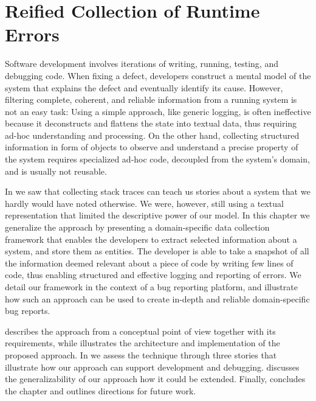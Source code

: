 

\chapter{Reified Collection of Runtime Errors}\label{ch:reified}


Software development involves iterations of writing, running, testing, and debugging code.
When fixing a defect, developers construct a mental model of the system that explains the defect and eventually identify its cause.
However, filtering complete, coherent, and reliable information from a running system is not an easy task: Using a simple approach, like generic logging, is often ineffective because it deconstructs and flattens the state into textual data, thus requiring ad-hoc understanding and processing.
On the other hand, collecting structured information in form of objects to observe and understand a precise property of the system requires specialized ad-hoc code, decoupled from the system's domain, and is usually not reusable.

In  we saw that  collecting stack traces can teach us stories about a system that we hardly would have noted otherwise.
We were, however, still using a textual representation that limited the descriptive power of our model.
In this chapter we generalize the approach by presenting a domain-specific data collection framework that enables the developers to extract selected information about a system, and store them as entities.
The developer is able to take a snapshot of all the information deemed relevant about a piece of code by writing few lines of code, thus enabling structured and effective logging and reporting of errors.
We detail our framework in the context of a bug reporting platform, and illustrate how such an approach can be used to create in-depth and reliable domain-specific bug reports.

\structure

 describes the approach from a conceptual point of view together with its requirements, while  illustrates the architecture and implementation of the proposed approach.
In  we assess the technique through three stories that illustrate how our approach can support development and debugging.
 discusses the generalizability of our approach how it could be extended.
Finally,  concludes the chapter and outlines directions for future work.

